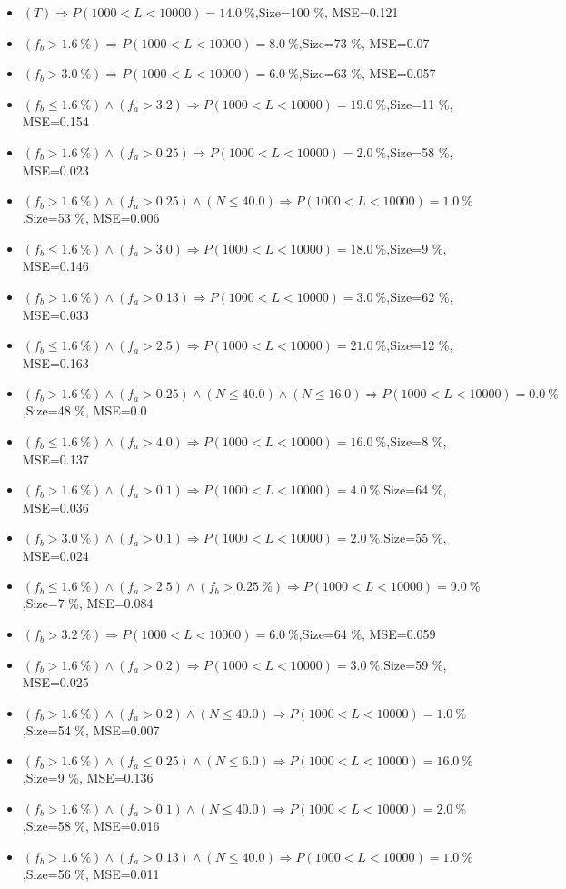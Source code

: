 \documentclass[numbered]{CSL}
\begin{document}
\begin{itemize}
\item $(T) \Rightarrow P(1 000 < L < 10 000) = 14.0~\%$,\hfill Size=100 \%, MSE=0.121
\item $(f_b > 1.6~\%) \Rightarrow P(1 000 < L < 10 000) = 8.0~\%$,\hfill Size=73 \%, MSE=0.07
\item $(f_b > 3.0~\%) \Rightarrow P(1 000 < L < 10 000) = 6.0~\%$,\hfill Size=63 \%, MSE=0.057
\item $(f_b \leq 1.6~\%) \land (f_a > 3.2) \Rightarrow P(1 000 < L < 10 000) = 19.0~\%$,\hfill Size=11 \%, MSE=0.154
\item $(f_b > 1.6~\%) \land (f_a > 0.25) \Rightarrow P(1 000 < L < 10 000) = 2.0~\%$,\hfill Size=58 \%, MSE=0.023
\item $(f_b > 1.6~\%) \land (f_a > 0.25) \land (N \leq 40.0) \Rightarrow P(1 000 < L < 10 000) = 1.0~\%$,\hfill Size=53 \%, MSE=0.006
\item $(f_b \leq 1.6~\%) \land (f_a > 3.0) \Rightarrow P(1 000 < L < 10 000) = 18.0~\%$,\hfill Size=9 \%, MSE=0.146
\item $(f_b > 1.6~\%) \land (f_a > 0.13) \Rightarrow P(1 000 < L < 10 000) = 3.0~\%$,\hfill Size=62 \%, MSE=0.033
\item $(f_b \leq 1.6~\%) \land (f_a > 2.5) \Rightarrow P(1 000 < L < 10 000) = 21.0~\%$,\hfill Size=12 \%, MSE=0.163
\item $(f_b > 1.6~\%) \land (f_a > 0.25) \land (N \leq 40.0) \land (N \leq 16.0) \Rightarrow P(1 000 < L < 10 000) = 0.0~\%$,\hfill Size=48 \%, MSE=0.0
\item $(f_b \leq 1.6~\%) \land (f_a > 4.0) \Rightarrow P(1 000 < L < 10 000) = 16.0~\%$,\hfill Size=8 \%, MSE=0.137
\item $(f_b > 1.6~\%) \land (f_a > 0.1) \Rightarrow P(1 000 < L < 10 000) = 4.0~\%$,\hfill Size=64 \%, MSE=0.036
\item $(f_b > 3.0~\%) \land (f_a > 0.1) \Rightarrow P(1 000 < L < 10 000) = 2.0~\%$,\hfill Size=55 \%, MSE=0.024
\item $(f_b \leq 1.6~\%) \land (f_a > 2.5) \land (f_b > 0.25~\%) \Rightarrow P(1 000 < L < 10 000) = 9.0~\%$,\hfill Size=7 \%, MSE=0.084
\item $(f_b > 3.2~\%) \Rightarrow P(1 000 < L < 10 000) = 6.0~\%$,\hfill Size=64 \%, MSE=0.059
\item $(f_b > 1.6~\%) \land (f_a > 0.2) \Rightarrow P(1 000 < L < 10 000) = 3.0~\%$,\hfill Size=59 \%, MSE=0.025
\item $(f_b > 1.6~\%) \land (f_a > 0.2) \land (N \leq 40.0) \Rightarrow P(1 000 < L < 10 000) = 1.0~\%$,\hfill Size=54 \%, MSE=0.007
\item $(f_b > 1.6~\%) \land (f_a \leq 0.25) \land (N \leq 6.0) \Rightarrow P(1 000 < L < 10 000) = 16.0~\%$,\hfill Size=9 \%, MSE=0.136
\item $(f_b > 1.6~\%) \land (f_a > 0.1) \land (N \leq 40.0) \Rightarrow P(1 000 < L < 10 000) = 2.0~\%$,\hfill Size=58 \%, MSE=0.016
\item $(f_b > 1.6~\%) \land (f_a > 0.13) \land (N \leq 40.0) \Rightarrow P(1 000 < L < 10 000) = 1.0~\%$,\hfill Size=56 \%, MSE=0.011
\end{itemize}
\end{document}
